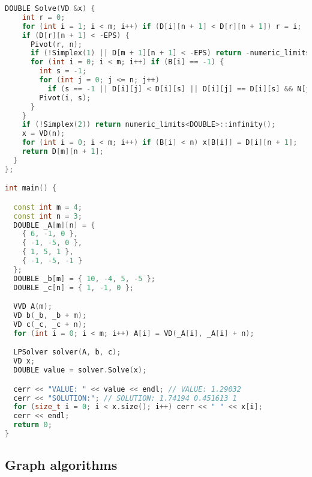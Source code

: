 \begin{lstlisting}[language=C++]
  DOUBLE Solve(VD &x) {
    int r = 0;
    for (int i = 1; i < m; i++) if (D[i][n + 1] < D[r][n + 1]) r = i;
    if (D[r][n + 1] < -EPS) {
      Pivot(r, n);
      if (!Simplex(1) || D[m + 1][n + 1] < -EPS) return -numeric_limits<DOUBLE>::infinity();
      for (int i = 0; i < m; i++) if (B[i] == -1) {
        int s = -1;
        for (int j = 0; j <= n; j++)
          if (s == -1 || D[i][j] < D[i][s] || D[i][j] == D[i][s] && N[j] < N[s]) s = j;
        Pivot(i, s);
      }
    }
    if (!Simplex(2)) return numeric_limits<DOUBLE>::infinity();
    x = VD(n);
    for (int i = 0; i < m; i++) if (B[i] < n) x[B[i]] = D[i][n + 1];
    return D[m][n + 1];
  }
};

int main() {

  const int m = 4;
  const int n = 3;
  DOUBLE _A[m][n] = {
    { 6, -1, 0 },
    { -1, -5, 0 },
    { 1, 5, 1 },
    { -1, -5, -1 }
  };
  DOUBLE _b[m] = { 10, -4, 5, -5 };
  DOUBLE _c[n] = { 1, -1, 0 };

  VVD A(m);
  VD b(_b, _b + m);
  VD c(_c, _c + n);
  for (int i = 0; i < m; i++) A[i] = VD(_A[i], _A[i] + n);

  LPSolver solver(A, b, c);
  VD x;
  DOUBLE value = solver.Solve(x);

  cerr << "VALUE: " << value << endl; // VALUE: 1.29032
  cerr << "SOLUTION:"; // SOLUTION: 1.74194 0.451613 1
  for (size_t i = 0; i < x.size(); i++) cerr << " " << x[i];
  cerr << endl;
  return 0;
}

\end{lstlisting}
\subsection{Graph algorithms}
